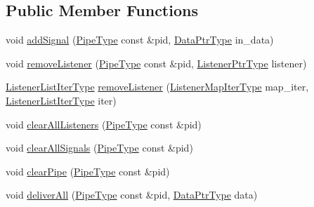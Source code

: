 \subsection*{Public Member Functions}
\begin{DoxyCompactItemize}
\item 
void \hyperlink{structvt_1_1pipe_1_1signal_1_1_signal_holder_ae32b546852bc4518b6d75f2e43a5eb5f}{add\+Signal} (\hyperlink{namespacevt_ac9852acda74d1896f48f406cd72c7bd3}{Pipe\+Type} const \&pid, \hyperlink{structvt_1_1pipe_1_1signal_1_1_signal_holder_aad5bfc2b46dfa071ae638385324d7e31}{Data\+Ptr\+Type} in\+\_\+data)
\item 
void \hyperlink{structvt_1_1pipe_1_1signal_1_1_signal_holder_a5be1905ef30b9c0e8764daa5f471d445}{remove\+Listener} (\hyperlink{namespacevt_ac9852acda74d1896f48f406cd72c7bd3}{Pipe\+Type} const \&pid, \hyperlink{structvt_1_1pipe_1_1signal_1_1_signal_holder_a68114d1ad5804c71e014736b18e41e08}{Listener\+Ptr\+Type} listener)
\item 
\hyperlink{structvt_1_1pipe_1_1signal_1_1_signal_holder_af0d3ccf4a8700979f414a0485cf41df5}{Listener\+List\+Iter\+Type} \hyperlink{structvt_1_1pipe_1_1signal_1_1_signal_holder_a08a8e0ba7a1eac7df48561112f5859ab}{remove\+Listener} (\hyperlink{structvt_1_1pipe_1_1signal_1_1_signal_holder_a7f6eed09a10f9b4f679c99ae85983879}{Listener\+Map\+Iter\+Type} map\+\_\+iter, \hyperlink{structvt_1_1pipe_1_1signal_1_1_signal_holder_af0d3ccf4a8700979f414a0485cf41df5}{Listener\+List\+Iter\+Type} iter)
\item 
void \hyperlink{structvt_1_1pipe_1_1signal_1_1_signal_holder_a5ef82532eb8d0d65fe7b07f7fb53491d}{clear\+All\+Listeners} (\hyperlink{namespacevt_ac9852acda74d1896f48f406cd72c7bd3}{Pipe\+Type} const \&pid)
\item 
void \hyperlink{structvt_1_1pipe_1_1signal_1_1_signal_holder_a9907ff2a131c6aafe6771c09b6ae9415}{clear\+All\+Signals} (\hyperlink{namespacevt_ac9852acda74d1896f48f406cd72c7bd3}{Pipe\+Type} const \&pid)
\item 
void \hyperlink{structvt_1_1pipe_1_1signal_1_1_signal_holder_a9f31fab057a4e9af38547859572b6127}{clear\+Pipe} (\hyperlink{namespacevt_ac9852acda74d1896f48f406cd72c7bd3}{Pipe\+Type} const \&pid)
\item 
void \hyperlink{structvt_1_1pipe_1_1signal_1_1_signal_holder_a3e04f57a784e41c422357dfda7871304}{deliver\+All} (\hyperlink{namespacevt_ac9852acda74d1896f48f406cd72c7bd3}{Pipe\+Type} const \&pid, \hyperlink{structvt_1_1pipe_1_1signal_1_1_signal_holder_aad5bfc2b46dfa071ae638385324d7e31}{Data\+Ptr\+Type} data)

\end{DoxyCompactItemize}
